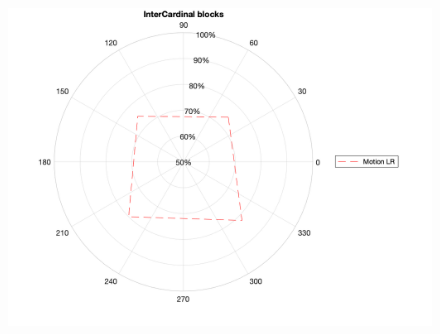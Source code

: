 \documentclass[11pt]{article} %
\begin{document}
\begin{figure}[H]
\includegraphics[scale=.15]{Images/BB_oblique_plot.png}
\end{figure}
\end{document}
